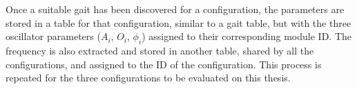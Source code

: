 Once a suitable gait has been discovered for a configuration, the parameters are stored in a table for that configuration, similar to a gait table, but with the three oscillator parameters ($A_i$, $O_i$, $\phi_i$)  assigned to their corresponding module ID. The frequency is also extracted and stored in another table, shared by all the configurations, and assigned to the ID of the configuration. This process is repeated for the three configurations to be evaluated on this thesis.\\